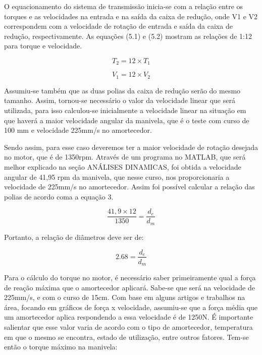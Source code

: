 		O equacionamento do sistema de transmissão inicia-se com a relação entre os torques e as velocidades na entrada e na saída da caixa de redução, onde V1 e V2 correspondem com a velocidade de rotação de entrada e saída da caixa de redução, respectivamente. As equações (5.1) e (5.2) mostram as relações de 1:12 para torque e velocidade.

		\begin{equation}
			 T_{2}=12 \times T_{1} 
		\end{equation}
		
		\begin{equation}
			 V_{1}=12 \times V_{2} 
		\end{equation}

		Assumiu-se também que as duas polias da caixa de redução serão do mesmo tamanho. Assim, tornou-se necessário o valor da velocidade linear que será utilizada, para isso calculou-se inicialmente a velocidade linear na situação em que haverá a maior velocidade angular da manivela, que é o teste com curso de 100 mm e velocidade 225mm/s no amortecedor. 

		Sendo assim, para esse caso deveremos ter a maior velocidade de rotação desejada no motor, que é de 1350rpm. Através de um programa no MATLAB, que será melhor explicado na seção ANÁLISES DINAMICAS, foi obtida a velocidade angular de 41,95 rpm da manivela, que nesse curso, nos proporcionaria a velocidade de 225mm/s no amortecedor. Assim foi possível calcular a relação das polias de acordo coma a equação 3.

		\begin{equation}
			\frac{41,9 \times 12}{1350}= \frac{ d_{e}}{d_m}
		\end{equation}

		Portanto, a relação de diâmetros deve ser de:

		\begin{equation}
			2.68=\frac{ d_{e}}{d_m}
		\end{equation}

		Para o cálculo do torque no motor, é necessário saber primeiramente qual a força de reação máxima que o amortecedor aplicará. Sabe-se que será na velocidade de 225mm/s, e com o curso de 15cm. Com base em alguns artigos e trabalhos na área, focando em gráficos de força x velocidade, assumiu-se que a força média que um amortecedor aplica respondendo a essa velocidade é de 1250N. É importante salientar que esse valor varia de acordo com o tipo de amortecedor, temperatura em que o mesmo se encontra, estado de utilização, entre outros fatores. Tem-se então o torque máximo na manivela:

